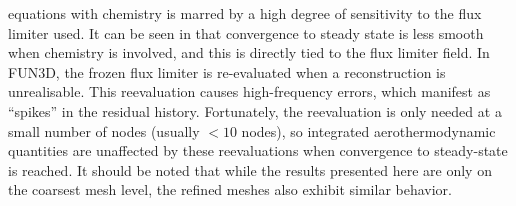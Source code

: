 equations with chemistry is marred by a high degree of sensitivity to the flux
limiter used.  It can be seen in  that convergence to
steady state is less smooth when chemistry is involved, and this is directly
tied to the flux limiter field.  In FUN3D, the frozen flux limiter is
re-evaluated when a reconstruction is unrealisable.  This reevaluation causes
high-frequency errors, which manifest as ``spikes'' in the residual history.
Fortunately, the reevaluation is only needed at a small number of nodes
(usually $< 10$ nodes), so integrated aerothermodynamic quantities are
unaffected by these reevaluations when convergence to steady-state is reached.
It should be noted that while the results presented here are only on the
coarsest mesh level, the refined meshes also exhibit similar behavior.

